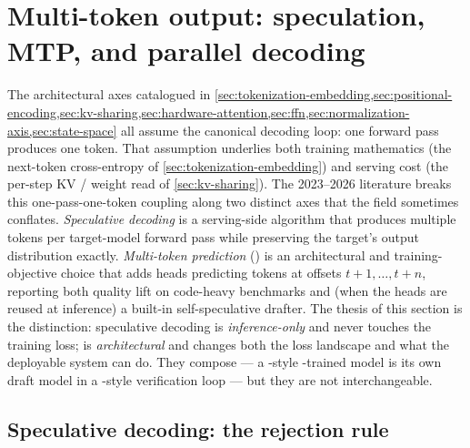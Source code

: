 
\section{Multi-token output: speculation, MTP, and parallel decoding}
\label{sec:multi-token-output}
\label{sec:multitoken}

The architectural axes catalogued in
\cref{sec:tokenization-embedding,sec:positional-encoding,sec:kv-sharing,sec:hardware-attention,sec:ffn,sec:normalization-axis,sec:state-space}
all assume the canonical  decoding loop: one forward pass
produces one token. That assumption underlies both training
mathematics (the next-token cross-entropy of
\cref{sec:tokenization-embedding}) and serving cost (the per-step KV /
weight read of \cref{sec:kv-sharing}). The 2023--2026 literature breaks
this one-pass-one-token coupling along two distinct axes that the field
sometimes conflates. \emph{Speculative decoding}
\citep{leviathan2023,chen2023-speculative} is a serving-side algorithm
that produces multiple tokens per target-model forward pass while
preserving the target's output distribution exactly. \emph{Multi-token
prediction} () \citep{gloeckle2024-mtp} is an architectural and
training-objective choice that adds heads predicting tokens at offsets
$t+1, \ldots, t+n$, reporting both quality lift on code-heavy
benchmarks and (when the heads are reused at inference) a built-in
self-speculative drafter. The thesis of this section is the distinction:
speculative decoding is \emph{inference-only} and never touches the
training loss;  is \emph{architectural} and changes both the loss
landscape and what the deployable system can do. They compose --- a
-style -trained model \citep[\S 2.3.1]{deepseek-v3} is
its own draft model in a -style verification loop --- but
they are not interchangeable.

\subsection{Speculative decoding: the rejection rule}
\label{sec:mt-leviathan}

